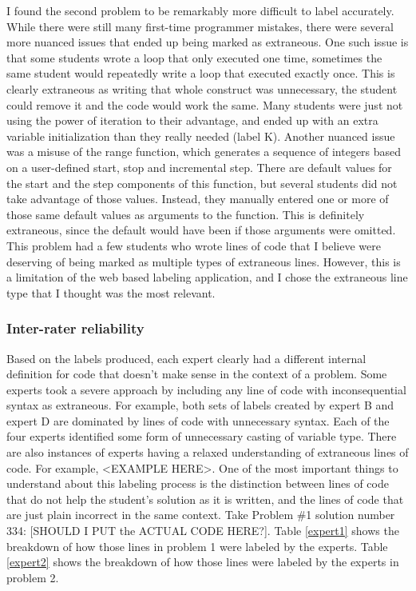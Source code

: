 \documentclass[draft]{article}
\begin{document}
I found the second problem to be remarkably more difficult to label accurately. While there were still many first-time programmer mistakes, there were several more nuanced issues that ended up being marked as extraneous. One such issue is that some students wrote a loop that only executed one time, sometimes the same student would repeatedly write a loop that executed exactly once. This is clearly extraneous as writing that whole construct was unnecessary, the student could remove it and the code would work the same. Many students were just not using the power of iteration to their advantage, and ended up with an extra variable initialization than they really needed (label K). Another nuanced issue was a misuse of the range function, which generates a sequence of integers based on a user-defined start, stop and incremental step. There are default values for the start and the step components of this function, but several students did not take advantage of those values. Instead, they manually entered one or more of those same default values as arguments to the function. This is definitely extraneous, since the default would have been if those arguments were omitted. This problem had a few students who wrote lines of code that I believe were deserving of being marked as multiple types of extraneous lines. However, this is a limitation of the web based labeling application, and I chose the extraneous line type that I thought was the most relevant.

\subsubsection{Inter-rater reliability}
Based on the labels produced, each expert clearly had a different internal definition for code that doesn't make sense in the context of a problem. Some experts took a severe approach by including any line of code with inconsequential syntax as extraneous. For example, both sets of labels created by expert B and expert D are dominated by lines of code with unnecessary syntax. Each of the four experts identified some form of unnecessary casting of variable type. There are also instances of experts having a relaxed understanding of extraneous lines of code. For example, <EXAMPLE HERE>. One of the most important things to understand about this labeling process is the distinction between lines of code that do not help the student's solution as it is written, and the lines of code that are just plain incorrect in the same context. Take Problem \#1 solution number 334: [SHOULD I PUT the ACTUAL CODE HERE?].  Table \ref{expert1} shows the breakdown of how those lines in problem 1 were labeled by the experts.  Table \ref{expert2} shows the breakdown of how those lines were labeled by the experts in problem 2.
\end{document}
